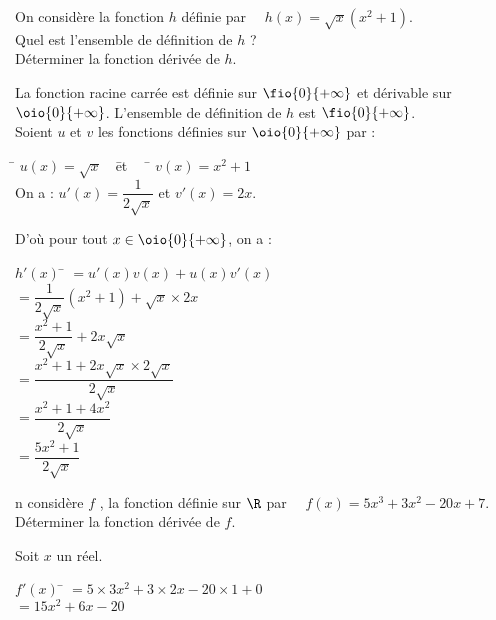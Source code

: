 \documentclass[a4paper,11pt,exos]{nsi}
\begin{document}
On considère la fonction $h$ définie par $\quad h(x)=\sqrt{x}(x^2+1)$.\\[.5em]
Quel est l'ensemble de définition de $h$ ?\\
Déterminer la fonction dérivée de $h$.\\[.5em]
\textcolor{UGLiBlue}{
    La fonction racine carrée est définie sur $\fio{0}{+\infty}$ et dérivable sur $\oio{0}{+\infty}$. L'ensemble de définition de $h$ est $\fio{0}{+\infty}$.\\
    Soient $u$ et $v$ les fonctions définies sur $\oio{0}{+\infty}$ par :
    \begin{tabbing}
        \hspace*{1.5cm}\= $u(x)=\sqrt{x}\quad$\= et $\quad$  \= $v(x)=x^2+1$\\
        On a :  \>$u'(x)=\dfrac{1}{2\sqrt{x}}$\> et \>$v'(x)=2x$.
    \end{tabbing}
    D'où pour tout $x\in\oio{0}{+\infty}$, on a :
    \begin{tabbing}
        $h'(x)$ \= $=u'(x)v(x)+u(x)v'(x)$\\[.5em]
        \> $=\dfrac{1}{2\sqrt{x}}(x^2+1)+\sqrt{x}\times 2x$\\[.5em]
        \> $=\dfrac{x^2+1}{2\sqrt{x}}+2x\sqrt{x}$\\[.5em]
        \> $=\dfrac{x^2+1+2x\sqrt{x}\times 2\sqrt{x}}{2\sqrt{x}}$\\[.5em]
        \> $=\dfrac{x^2+1+4x^2}{2\sqrt{x}}$\\[.5em]
        \> $=\dfrac{5x^2+1}{2\sqrt{x}}$
    \end{tabbing}
}

\newpage

\maketitle


n considère $f$ , la fonction définie sur $\R$ par $\quad f(x)=5x^3+3x^2-20x+7$.\\
Déterminer la fonction dérivée de $f$.\\[.5em]
\textcolor{UGLiBlue}{
    Soit $x$ un réel.
    \begin{tabbing}
        $f'(x)$ \= $=5\times 3x^2+3\times 2x-20\times 1+0$\\
        \> $=15x^2+6x-20$
    \end{tabbing}
}
\end{document}

